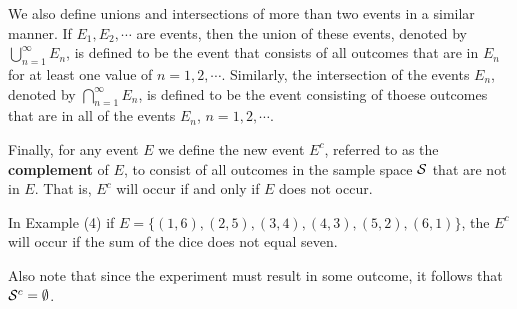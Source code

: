 We also define unions and intersections of more than two events in a similar manner. If $E_1, E_2, \cdots$ are events, then the union of these events, denoted by $\bigcup_{n = 1}^\infty E_n$, is defined to be the event that consists of all outcomes that are in $E_n$ for at least one value of $n = 1, 2, \cdots$. Similarly, the intersection of the events $E_n$, denoted by $\bigcap_{n = 1}^\infty E_n$, is defined to be the event consisting of thoese outcomes that are in all of the events $E_n$, $n = 1,2, \cdots$.

\begin{definition}
    Finally, for any event $E$ we define the new event $E^c$, referred to as the \textbf{complement} of $E$, to consist of all outcomes in the sample space $\mathcal{S}$ that are not in $E$. That is,  $E^c$ will occur if and only if $E$ does not occur. 
\end{definition}

In Example (4) if $E = \{(1,6), (2,5), (3,4), (4,3), (5,2), (6,1)\}$, the $E^c$ will occur if the sum of the dice does not equal seven. 

\begin{remark}
    Also note that since the experiment must result in some outcome, it follows that $\mathcal{S}^c = \emptyset$.
\end{remark}
